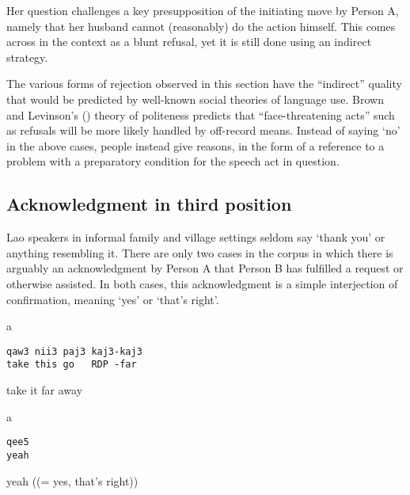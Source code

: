 \documentclass[output=paper]{langsci/langscibook}
\begin{document}
Her question challenges a key presupposition of the initiating move by Person A, namely that her husband cannot (reasonably) do the action himself. This comes across in the context as a blunt refusal, yet it is still done using an indirect strategy.

The various forms of rejection observed in this section have the “indirect” quality that would be predicted by well-known social theories of language use. Brown and Levinson's (\citeyear{BrownLevinson1987}) theory of politeness predicts that “face-threatening acts” such as refusals will be more likely handled by off-record means. Instead of saying ‘no’ in the above cases, people instead give reasons, in the form of a reference to a problem with a preparatory condition for the speech act in question.

\subsection{Acknowledgment in third position}

Lao speakers in informal family and village settings seldom say ‘thank you’ or anything resembling it. There are only two cases in the corpus in which there is arguably an acknowledgment by Person A that Person B has fulfilled a request or otherwise assisted. In both cases, this acknowledgment is a simple interjection of confirmation, meaning ‘yes’ or ‘that’s right’.

\vspace{-1mm}
%
\begin{mdframednoverticalspace}[style=firstfoc]
%
\begin{transbox}{1}{a}
\begin{verbatim}
qaw3 nii3 paj3 kaj3-kaj3
take this go   RDP -far
\end{verbatim}
take it far away
\end{transbox}
\end{mdframednoverticalspace}
%
\begin{mdframednoverticalspace}[style=secondfoc]
\end{mdframednoverticalspace}\vspace{-1mm}
%
\begin{transbox}{3}{a}
\begin{verbatim}
qee5
yeah
\end{verbatim}
yeah ((= yes, that’s right))
\end{transbox}\smallskip
\end{document}
